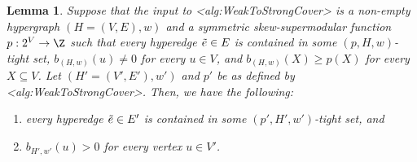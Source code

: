 \documentclass{article}
\def\Cref#1{<#1>}%
\newtheorem{lemma}{Lemma}[section]
\newcommand{\shubhang}[1]{{\color{blue}[{\tiny Shubhang: \bf #1}]\marginpar{\color{blue}*}}}
\newcommand{\knote}[1]{{\color{red}[{\tiny Karthik: \bf #1}]\marginpar{\color{red}*}}}
\newcommand{\maximalTightSetContainingHyperedge}[1]{\ensuremath{\tau_{#1}}\xspace}
\begin{document}
\begin{lemma}\label{lem:weak-to-strong-cover:next-recursive-call-hypothesis-satification:hyperedge-in-tight-set-positive-coverage}
Suppose that the input to \Cref{alg:WeakToStrongCover} is a non-empty hypergraph $(H = (V, E), w)$ and a symmetric skew-supermodular function $p:2^V\rightarrow \Z$ %
such that every hyperedge $\Tilde{e} \in E$ is contained in some $(p, H, w)$-tight set, $b_{(H,w)}(u) \not = 0$ for every $u \in V$, and $b_{(H,w)}(X) \geq p(X)$ for every $X \subseteq V$. 
Let $(H' = (V', E'), w')$ and $p'$ be as defined by \Cref{alg:WeakToStrongCover}. Then, we have the following:
\begin{enumerate}
    \item every hyperedge $\Tilde{e} \in E'$ is contained in some $(p', H', w')$-tight set, and
    \item  $b_{H',w'}(u) > 0$ for every vertex $u \in V'$.
\end{enumerate}
\end{lemma}
\end{document}
